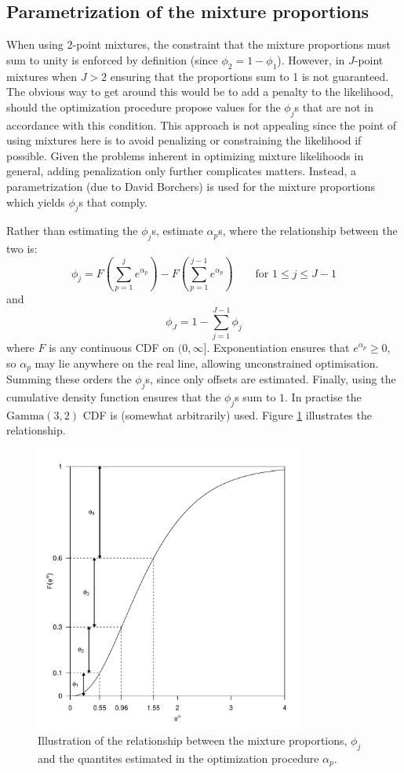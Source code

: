 \subsection{Parametrization of the mixture proportions}

When using 2-point mixtures, the constraint that the mixture proportions must sum to unity is enforced by definition (since $\phi_2=1-\phi_1$). However, in $J$-point mixtures when $J>2$ ensuring that the proportions sum to 1 is not guaranteed. The obvious way to get around this would be to add a penalty to the likelihood, should the optimization procedure propose values for the $\phi_j$s that are not in accordance with this condition. This approach is not appealing since the point of using mixtures here is to avoid penalizing or constraining the likelihood if possible. Given the problems inherent in optimizing mixture likelihoods in general, adding penalization only further complicates matters. Instead, a parametrization (due to David Borchers) is used for the mixture proportions which yields $\phi_j$s that comply.

Rather than estimating the $\phi_j$s, estimate $\alpha_p$s, where the relationship between the two is:
\begin{equation*}
\phi_j = F(\sum_{p=1}^j e^{\alpha_p}) - F(\sum_{p=1}^{j-1} e^{\alpha_p}) \qquad \text{for } 1\leq j \leq J-1
\end{equation*}
and
\begin{equation*}
\phi_J = 1-\sum_{j=1}^{J-1} \phi_j
\end{equation*}
where $F$ is any continuous CDF on $(0,\infty]$. Exponentiation ensures that $e^{\alpha_p}\geq0$, so $\alpha_p$ may lie anywhere on the real line, allowing unconstrained optimisation. Summing these orders the $\phi_j$s, since only offsets are estimated. Finally, using the cumulative density function ensures that the $\phi_j$s sum to $1$. In practise the $\text{Gamma}(3,2)$ CDF is (somewhat arbitrarily) used. Figure \ref{mmds-phifig} illustrates the relationship.

\begin{figure}
\centering
\includegraphics[width=3.5in]{mix/figs/phidia.pdf}
\caption{Illustration of the relationship between the mixture proportions, $\phi_j$ and the quantites estimated in the optimization procedure $\alpha_p$.}
\label{mmds-phifig}
\end{figure}

